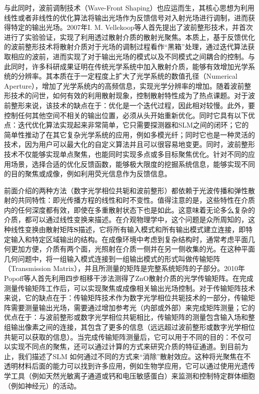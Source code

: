 与此同时，波前调制技术（Wave-Front Shaping）\cite{Vellekoop2007}也应运而生，其核心思想为利用线性或者非线性的优化算法将输出光场作为反馈信号对入射光场进行调制，进而获得特定的输出光场。2007年I. M. Vellekoop等人\cite{Vellekoop2007}首先提出了波前整形技术，并首次进行了实验验证，实现了利用透过散射介质的散射光聚焦。本质上，基于反馈优化的波前整形技术将散射介质对于光场的调制过程看作“黑箱”处理，通过迭代算法获取相应的波前，进而实现了对于输出光场的模式以及不同模式之间耦合的控制。与此同时，许多科研成果证明在传统光学系统中加入散射介质，能够有效增加光学系统的分辨率\cite{vellekoop_exploiting_2010,choi_overcoming_2011}。其本质在于一定程度上扩大了光学系统的数值孔径（Numerical Aperture），增加了光学系统内的高频信息，实现光学分辨率的增加。随着波前整形技术的问世，如何有效的利用散射现象，控制散射特性成为了热点课题。对于波前整形来说，该技术的缺点在于：优化是一个迭代过程，因此相对较慢。此外，要控制任何其他空间不相关的输出位置，必须从头开始重新优化。同时它具有以下优点：迭代优化算法实现起来非常简单，它只需要探测器和SLM之间的闭环；它的简单性推动了在其它复杂光学系统的应用，例如多模光纤；同时它也是一种灵活的技术，因为用户可以最大化的自定义算法并且可以很容易地变更。同时，波前整形技术不仅能够实现单点聚焦，也能同时实现多点或多目标聚焦优化。针对不同的应用场景，选择合适的优化反馈函数，能够极大限度的挖掘系统信息，能够实现不同的目的聚焦或成像，例如利用荧光信息作为反馈信息\cite{boniface_non_invasive_2019}。

前面介绍的两种方法（数字光学相位共轭和波前整形）都依赖于光波传播和弹性散射的共同特性：即光传播方程的线性和时不变性。值得注意的是，这些特性在介质内的任何深度都有效，即使在多重散射状态下也是如此。这意味着无论多么复杂的介质，都可以通过线性变换来描述。在介观物理学中，这个问题是众所周知的，这种线性变换由散射矩阵$\mathbf{S}$描述，它将所有输入模式和所有输出模式建立连接，即特定输入和特定区域输出的结构。在成像环境中考虑到复杂结构时，通常考虑平面几何更加方便，介质有两个面，光照射在介质一侧并在另一侧收集的光。在这种平面几何问题中，将一组输入模式连接到一组输出模式的形式叫做传输矩阵（Transmission Matrix），并且所测量的矩阵是完整系统矩阵的子部分。2010年Popoff等人\cite{Popoff2010}首先利用四步相移干涉法测得了ZnO散射介质的光学传输矩阵。在完成测量传输矩阵工作后，可以实现聚焦或成像相关输出光场控制。对于传输矩阵技术来说，它的缺点在于：传输矩阵技术作为数字光学相位共轭技术的一部分，传输矩阵需要测量输出光场，需要通过增加参考光（内部或外部）来完成矩阵测量；它的优点在于：与波前整形或数字光学相位共轭相比，传输矩阵的测量包含输入场和整组输出像素之间的连接，其包含了更多的信息（远远超过波前整形或数字光学相位共轭可以获取的信息）。当完成传输矩阵测量后，它可以用于不同的目的：不仅可以实现不同点的聚焦，还可以通过计算的方式来研究介质的特征通道。到目前为止，我们描述了SLM 如何通过不同的方式来“消除”散射效应。这种将光聚焦在不透明材料后面的能力可以找到许多应用，例如生物学应用，它可以通过使用光遗传学工具（例如天然光敏离子通道或钙和电压敏感蛋白）来监测和控制特定群体细胞（例如神经元）的活动\cite{petreanu_channelrhodopsin-2assisted_2007}。

